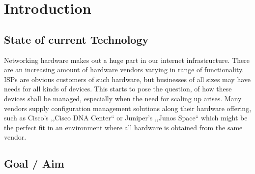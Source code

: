 \chapter{\label{introduction}Introduction}
\thispagestyle{fancy}


\section{\label{introduction-current}State of current Technology}

Networking hardware makes out a huge part in our internet infrastructure. There are an increasing amount of hardware vendors varying in range of functionality. \glspl{ISP} are obvious customers of such hardware, but businesses of all sizes may have needs for all kinds of devices. This starts to pose the question, of how these devices shall be managed, especially when the need for scaling up arises. Many vendors supply configuration management solutions along their hardware offering, such as Cisco's ,,Cisco DNA Center``\cite{noauthor_cisco_nodate} or Juniper's ,,Junos Space``\cite{noauthor_junos_nodate} which might be the perfect fit in an environment where all hardware is obtained from the same vendor.




\section{\label{introduction-goal}Goal / Aim}






